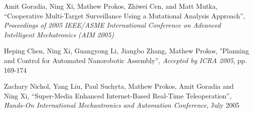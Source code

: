 \documentclass[line]{res}
\begin{document}
\begin{resume}
   \vspace{-2mm}
   Amit Goradia, Ning Xi, Mathew Prokos, Zhiwei Cen, and Matt Mutka,
   ``Cooperative Multi-Target Surveillance Using a Mutational Analysis Approach'',
   \textsl{Proceedings of 2005 IEEE/ASME International Conference on
      Advanced Intelligent Mechatronics (AIM 2005)}

   \vspace{-2mm}
   Heping Chen, Ning Xi, Guangyong Li, Jiangbo Zhang, Mathew Prokos,
   "Planning and Control for Automated Nanorobotic Assembly'',
   \textsl{Accepted by ICRA 2005}, pp. 169-174

   \vspace{-2mm}
   Zachary Nichol, Yang Liu, Paul Suchyta, Mathew Prokos, Amit Goradia and Ning Xi,
   ``Super-Media Enhanced Internet-Based Real-Time Teleoperation'',
   \textsl{Hands-On International Mechantronics and Automation Conference}, July 2005
\end{resume}
\end{document}
